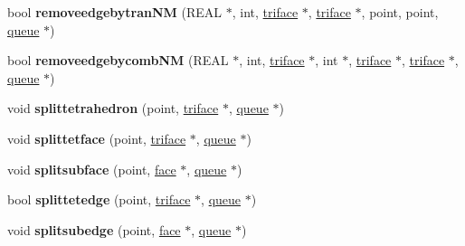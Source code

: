\begin{DoxyCompactItemize}
\item 
\hypertarget{classtetgenmesh_aed686875a52fa823878c50787fb170e1}{bool {\bfseries removeedgebytran\-N\-M} (R\-E\-A\-L $\ast$, int, \hyperlink{classtetgenmesh_1_1triface}{triface} $\ast$, \hyperlink{classtetgenmesh_1_1triface}{triface} $\ast$, point, point, \hyperlink{classtetgenmesh_1_1queue}{queue} $\ast$)}\label{classtetgenmesh_aed686875a52fa823878c50787fb170e1}

\item 
\hypertarget{classtetgenmesh_a1ebea29328f0539615ff55284d70def3}{bool {\bfseries removeedgebycomb\-N\-M} (R\-E\-A\-L $\ast$, int, \hyperlink{classtetgenmesh_1_1triface}{triface} $\ast$, int $\ast$, \hyperlink{classtetgenmesh_1_1triface}{triface} $\ast$, \hyperlink{classtetgenmesh_1_1triface}{triface} $\ast$, \hyperlink{classtetgenmesh_1_1queue}{queue} $\ast$)}\label{classtetgenmesh_a1ebea29328f0539615ff55284d70def3}

\item 
\hypertarget{classtetgenmesh_a27756af8aad0148e8135996b132bf226}{void {\bfseries splittetrahedron} (point, \hyperlink{classtetgenmesh_1_1triface}{triface} $\ast$, \hyperlink{classtetgenmesh_1_1queue}{queue} $\ast$)}\label{classtetgenmesh_a27756af8aad0148e8135996b132bf226}

\item 
\hypertarget{classtetgenmesh_a74366d7005be77f2f800c63d6ee94a33}{void {\bfseries splittetface} (point, \hyperlink{classtetgenmesh_1_1triface}{triface} $\ast$, \hyperlink{classtetgenmesh_1_1queue}{queue} $\ast$)}\label{classtetgenmesh_a74366d7005be77f2f800c63d6ee94a33}

\item 
\hypertarget{classtetgenmesh_a8d532166b9cc6de474312013a9a48ae1}{void {\bfseries splitsubface} (point, \hyperlink{classtetgenmesh_1_1face}{face} $\ast$, \hyperlink{classtetgenmesh_1_1queue}{queue} $\ast$)}\label{classtetgenmesh_a8d532166b9cc6de474312013a9a48ae1}

\item 
\hypertarget{classtetgenmesh_a3458049e660a2bc0906dc6d7cbf6c9e3}{bool {\bfseries splittetedge} (point, \hyperlink{classtetgenmesh_1_1triface}{triface} $\ast$, \hyperlink{classtetgenmesh_1_1queue}{queue} $\ast$)}\label{classtetgenmesh_a3458049e660a2bc0906dc6d7cbf6c9e3}

\item 
\hypertarget{classtetgenmesh_aa0f3221985acbfba85b97280130e47a0}{void {\bfseries splitsubedge} (point, \hyperlink{classtetgenmesh_1_1face}{face} $\ast$, \hyperlink{classtetgenmesh_1_1queue}{queue} $\ast$)}\label{classtetgenmesh_aa0f3221985acbfba85b97280130e47a0}


\end{DoxyCompactItemize}
